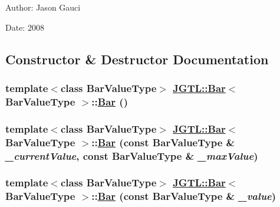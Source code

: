 \begin{Desc}
\item[Author:]Jason Gauci \end{Desc}
\begin{Desc}
\item[Date:]2008 \end{Desc}




\subsection{Constructor \& Destructor Documentation}
\hypertarget{class_j_g_t_l_1_1_bar_4062490561fb2673bc0e10883dc34303}{
\subsubsection[Bar]{\setlength{\rightskip}{0pt plus 5cm}template$<$class Bar\-Value\-Type$>$ \hyperlink{class_j_g_t_l_1_1_bar}{JGTL::Bar}$<$ Bar\-Value\-Type $>$::\hyperlink{class_j_g_t_l_1_1_bar}{Bar} ()}}
\label{class_j_g_t_l_1_1_bar_4062490561fb2673bc0e10883dc34303}


\hypertarget{class_j_g_t_l_1_1_bar_6dec0180bae966481b4d060d10781dfe}{
\subsubsection[Bar]{\setlength{\rightskip}{0pt plus 5cm}template$<$class Bar\-Value\-Type$>$ \hyperlink{class_j_g_t_l_1_1_bar}{JGTL::Bar}$<$ Bar\-Value\-Type $>$::\hyperlink{class_j_g_t_l_1_1_bar}{Bar} (const Bar\-Value\-Type \& {\em \_\-current\-Value}, const Bar\-Value\-Type \& {\em \_\-max\-Value})}}
\label{class_j_g_t_l_1_1_bar_6dec0180bae966481b4d060d10781dfe}


\hypertarget{class_j_g_t_l_1_1_bar_f847730457e55a0cfecb6c918cc3366f}{
\subsubsection[Bar]{\setlength{\rightskip}{0pt plus 5cm}template$<$class Bar\-Value\-Type$>$ \hyperlink{class_j_g_t_l_1_1_bar}{JGTL::Bar}$<$ Bar\-Value\-Type $>$::\hyperlink{class_j_g_t_l_1_1_bar}{Bar} (const Bar\-Value\-Type \& {\em \_\-value})}}
\label{class_j_g_t_l_1_1_bar_f847730457e55a0cfecb6c918cc3366f}




